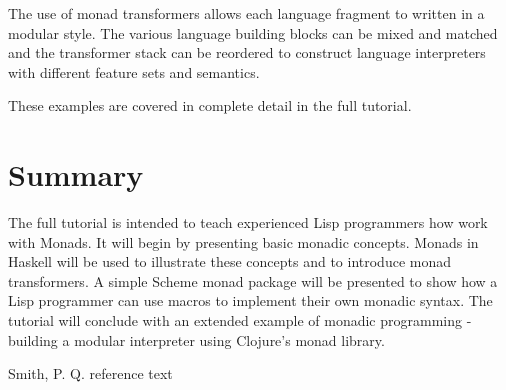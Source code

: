 \documentclass[natbib,10pt]{sigplanconf}
\begin{document}
The use of monad transformers allows each language fragment to written
in a modular style.  The various language building blocks can be mixed
and matched and the transformer stack can be reordered to construct
language interpreters with different feature sets and semantics.

These examples are covered in complete detail in the full tutorial.

\section{Summary}
The full tutorial is intended to teach experienced Lisp programmers how 
work with Monads. It will begin by presenting basic monadic concepts. 
Monads in Haskell will be used to illustrate these concepts and to 
introduce monad transformers. A simple Scheme monad package will be 
presented to show how a Lisp programmer can use macros to implement
their own monadic syntax. The tutorial will conclude with an extended
example of monadic programming - building a modular interpreter using
Clojure's monad library.







\begin{thebibliography}{}

Smith, P. Q. reference text

\end{thebibliography}
\end{document}
